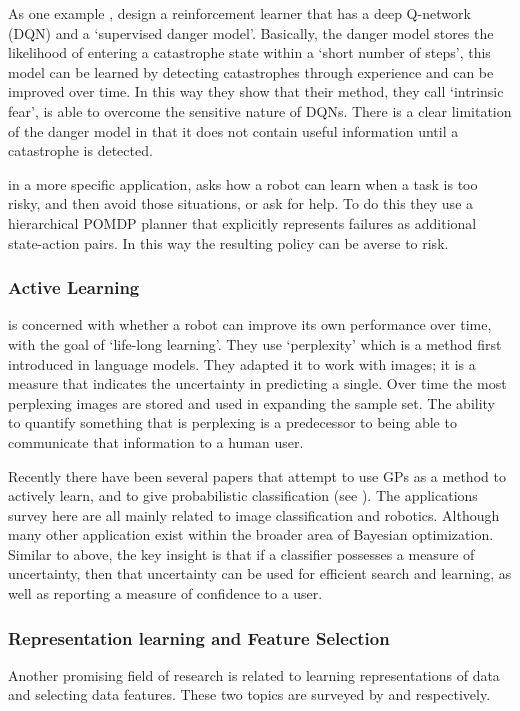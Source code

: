     As one example \citet{Lipton2016-dq}, design a reinforcement learner that has a deep Q-network (DQN) and a `supervised danger model'. Basically, the danger model stores the likelihood of entering a catastrophe state within a `short number of steps', this model can be learned by detecting catastrophes through experience and can be improved over time.  In this way they show that their method, they call `intrinsic fear', is able to overcome the sensitive nature of DQNs. There is a clear limitation of the danger model in that it does not contain useful information until a catastrophe is detected.
    
    \citet{Curran2016-ij} in a more specific application, asks how a robot can learn when a task is too risky, and then avoid those situations, or ask for help. To do this they use a hierarchical POMDP planner that explicitly represents failures as additional state-action pairs. In this way the resulting policy can be averse to risk.
    

\subsubsection{Active Learning}
    \citet{Paul2011-vr} is concerned with whether a robot can improve its own performance over time, with the goal of `life-long learning'. They use `perplexity' which is a method first introduced in language models. They adapted it to work with images; it is a measure that indicates the uncertainty in predicting a single. Over time the most perplexing images are stored and used in expanding the sample set. The ability to quantify something that is perplexing is a predecessor to being able to communicate that information to a human user. 

    Recently there have been several papers that attempt to use GPs as a method to actively learn, and to give probabilistic classification (see \citet{MacKay1992-sp,Triebel2016-kj,Triebel2013-ow,Triebel2013-ku,Grimmett2013-gj,Grimmett2016-yc,Berczi2015-rd,Dequaire2016-kh}). The applications survey here are all mainly related to image classification and robotics. Although many other application exist within the broader area of Bayesian optimization. Similar to above, the key insight is that if a classifier possesses a measure of uncertainty, then that uncertainty can be used for efficient search and learning, as well as reporting a measure of confidence to a user.

\subsubsection{Representation learning and Feature Selection}
    Another promising field of research is related to learning representations of data and selecting data features. These two topics are surveyed by \citet{Bengio2013-uv} and \citet{Guyon2003-fj} respectively.

